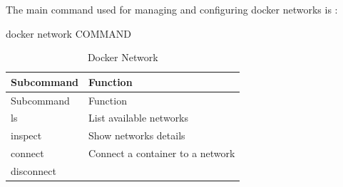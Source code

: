 \documentclass[
  14pt,
  english,
  a4paper,
]{scrreprt}
\newenvironment{Shaded}{}{}
\newcommand{\ExtensionTok}[1]{#1}
\newcommand{\NormalTok}[1]{#1}
\begin{document}
The main command used for managing and configuring docker networks is :

\begin{Shaded}
\begin{Highlighting}[]
\ExtensionTok{docker}\NormalTok{ network COMMAND}
\end{Highlighting}
\end{Shaded}

\hypertarget{tbl:docker_network}{}
\begin{longtable}[]{@{}ll@{}}
\caption{\label{tbl:docker_network}Docker Network}\tabularnewline
\toprule
\begin{minipage}[b]{0.17\columnwidth}\raggedright
Subcommand\strut
\end{minipage} & \begin{minipage}[b]{0.52\columnwidth}\raggedright
Function\strut
\end{minipage}\tabularnewline
\midrule
\endfirsthead
\toprule
\begin{minipage}[b]{0.17\columnwidth}\raggedright
Subcommand\strut
\end{minipage} & \begin{minipage}[b]{0.52\columnwidth}\raggedright
Function\strut
\end{minipage}\tabularnewline
\midrule
\endhead
\begin{minipage}[t]{0.17\columnwidth}\raggedright
ls\strut
\end{minipage} & \begin{minipage}[t]{0.52\columnwidth}\raggedright
List available networks\strut
\end{minipage}\tabularnewline
\begin{minipage}[t]{0.17\columnwidth}\raggedright
inspect\strut
\end{minipage} & \begin{minipage}[t]{0.52\columnwidth}\raggedright
Show networks details\strut
\end{minipage}\tabularnewline
\begin{minipage}[t]{0.17\columnwidth}\raggedright
connect\strut
\end{minipage} & \begin{minipage}[t]{0.52\columnwidth}\raggedright
Connect a container to a network\strut
\end{minipage}\tabularnewline
\begin{minipage}[t]{0.17\columnwidth}\raggedright
disconnect\strut
\end{minipage} & \begin{minipage}[t]{0.52\columnwidth}\raggedright

\end{minipage}
\end{longtable}
\end{document}

